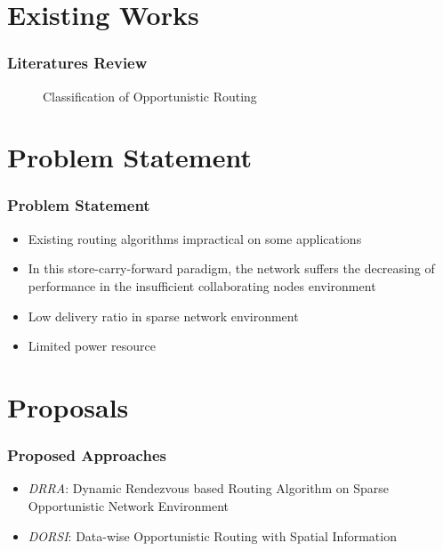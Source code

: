 \documentclass{beamer}
\begin{document}
\section{Existing Works}
\begin{frame}
	\frametitle{Literatures Review}

	\begin{figure}
	\centering
	\caption{Classification of Opportunistic Routing}
	\label{fig:bg:RoutingInOppNets}
\end{figure}

	
\end{frame}
\section{Problem Statement}
\begin{frame}
\frametitle{Problem Statement}


\begin{itemize}
\item Existing routing algorithms impractical on some applications
\item In this store-carry-forward paradigm, the network suffers the decreasing of performance in the insufficient collaborating nodes environment \cite{Spyropoulos2010}
\item Low delivery ratio in sparse network environment
\item Limited power resource 

\end{itemize}
\end{frame}
\section{Proposals}
\begin{frame}
	\frametitle{Proposed Approaches}
	\begin{itemize}
		\item{\emph{DRRA}:} Dynamic Rendezvous based Routing Algorithm on Sparse Opportunistic Network Environment 
		\item{\emph{DORSI}:} Data-wise Opportunistic Routing with Spatial Information		
	\end{itemize}
\end{frame}
\end{document}
